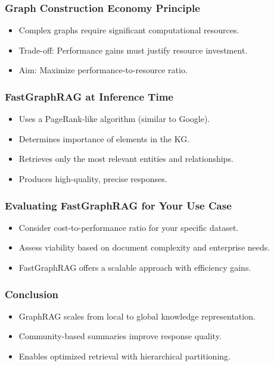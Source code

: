 \begin{frame}[fragile]\frametitle{Graph Construction Economy Principle}
    \begin{itemize}
        \item Complex graphs require significant computational resources.
        \item Trade-off: Performance gains must justify resource investment.
        \item Aim: Maximize performance-to-resource ratio.
    \end{itemize}
\end{frame}

\begin{frame}[fragile]\frametitle{FastGraphRAG at Inference Time}
    \begin{itemize}
        \item Uses a PageRank-like algorithm (similar to Google).
        \item Determines importance of elements in the KG.
        \item Retrieves only the most relevant entities and relationships.
        \item Produces high-quality, precise responses.
    \end{itemize}
\end{frame}

\begin{frame}[fragile]\frametitle{Evaluating FastGraphRAG for Your Use Case}
    \begin{itemize}
        \item Consider cost-to-performance ratio for your specific dataset.
        \item Assess viability based on document complexity and enterprise needs.
        \item FastGraphRAG offers a scalable approach with efficiency gains.
    \end{itemize}
\end{frame}




\begin{frame}[fragile]\frametitle{Conclusion}
    \begin{itemize}
        \item GraphRAG scales from local to global knowledge representation.
        \item Community-based summaries improve response quality.
        \item Enables optimized retrieval with hierarchical partitioning.
    \end{itemize}
\end{frame}




